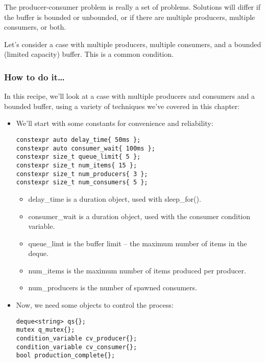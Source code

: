 
The producer-consumer problem is really a set of problems. Solutions will differ if the buffer is bounded or unbounded, or if there are multiple producers, multiple consumers, or both.

Let's consider a case with multiple producers, multiple consumers, and a bounded (limited capacity) buffer. This is a common condition.

\subsubsection{How to do it…}

In this recipe, we'll look at a case with multiple producers and consumers and a bounded buffer, using a variety of techniques we've covered in this chapter:

\begin{itemize}
\item 
We'll start with some constants for convenience and reliability:

\begin{lstlisting}[style=styleCXX]
constexpr auto delay_time{ 50ms };
constexpr auto consumer_wait{ 100ms };
constexpr size_t queue_limit{ 5 };
constexpr size_t num_items{ 15 };
constexpr size_t num_producers{ 3 };
constexpr size_t num_consumers{ 5 };
\end{lstlisting}

\begin{itemize}
\item
delay\_time is a duration object, used with sleep\_for().

\item 
consumer\_wait is a duration object, used with the consumer condition variable.

\item 
queue\_limt is the buffer limit – the maximum number of items in the deque.

\item 
num\_items is the maximum number of items produced per producer.

\item 
num\_producers is the number of spawned consumers.
\end{itemize}

\item 
Now, we need some objects to control the process:

\begin{lstlisting}[style=styleCXX]
deque<string> qs{};
mutex q_mutex{};
condition_variable cv_producer{};
condition_variable cv_consumer{};
bool production_complete{};
\end{lstlisting}


\end{itemize}
